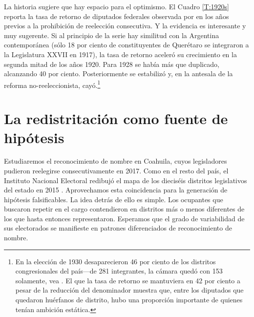 \documentclass[letter,12pt]{article}
\begin{document}
La historia sugiere que hay espacio para el optimismo. El Cuadro \ref{T:1920s} reporta la tasa de retorno de diputados federales observada por \citet{godoy.reeleccion.2014} en los años previos a la prohibición de reelección consecutiva. Y la evidencia es interesante y muy sugerente. Si al principio de la serie hay similitud con la Argentina contemporánea (s\'olo 18 por ciento de constituyentes de Querétaro se integraron a la Legislatura XXVII en 1917), la tasa de retorno aceleró su crecimiento en la segunda mitad de los años 1920. Para 1928 se había más que duplicado, alcanzando 40 por ciento. Posteriormente se estabilizó y, en la antesala de la reforma no-reeleccionista, cayó.\footnote{En la elección de 1930 desaparecieron 46 por ciento de los distritos congresionales del país---de 281 integrantes, la cámara quedó con 153 solamente, vea \citet[][:23]{godoy.reeleccion.2014}. El que la tasa de retorno se mantuviera en 42 por ciento a pesar de la reducción del denominador muestra que, entre los diputados que quedaron huérfanos de distrito, hubo una proporción importante de quienes tenían ambición estática.} 



\section{La redistritación como fuente de hipótesis}

\noindent Estudiaremos el reconocimiento de nombre en Coahuila, cuyos legisladores pudieron reelegirse consecutivamente en 2017. Como en el resto del país, el Instituto Nacional Electoral redibujó el mapa de los dieciséis distritos legislativos del estado en 2015 \citep{trelles.etalDatosabiertos.pyg.2016}. Aprovechamos esta coincidencia para la generación de hipótesis falsificables. La idea detrás de ello es simple. Los ocupantes que buscaron repetir en el cargo contendieron en distritos más o menos diferentes de los que hasta entonces representaron. Esperamos que el grado de variabilidad de sus electorados se manifieste en patrones diferenciados de reconocimiento de nombre. 
\end{document}
